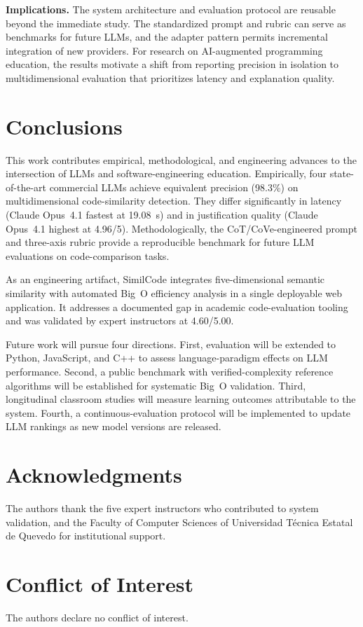 \documentclass[twocolumn,11pt]{article}
\begin{document}
    \textbf{Implications.} The system architecture and evaluation protocol are reusable beyond the immediate study. The standardized prompt and rubric can serve as benchmarks for future LLMs, and the adapter pattern permits incremental integration of new providers. For research on AI-augmented programming education, the results motivate a shift from reporting precision in isolation to multidimensional evaluation that prioritizes latency and explanation quality.
    \section{Conclusions}\label{sec:conclusion}
    This work contributes empirical, methodological, and engineering advances to the intersection of LLMs and software-engineering education. Empirically, four state-of-the-art commercial LLMs achieve equivalent precision (98.3\%) on multidimensional code-similarity detection. They differ significantly in latency (Claude Opus~4.1 fastest at 19.08~s) and in justification quality (Claude Opus~4.1 highest at 4.96/5). Methodologically, the CoT/CoVe-engineered prompt and three-axis rubric provide a reproducible benchmark for future LLM evaluations on code-comparison tasks.
     
    As an engineering artifact, SimilCode integrates five-dimensional semantic similarity with automated Big~O efficiency analysis in a single deployable web application. It addresses a documented gap in academic code-evaluation tooling and was validated by expert instructors at 4.60/5.00.
     
    Future work will pursue four directions. First, evaluation will be extended to Python, JavaScript, and C++ to assess language-paradigm effects on LLM performance. Second, a public benchmark with verified-complexity reference algorithms will be established for systematic Big~O validation. Third, longitudinal classroom studies will measure learning outcomes attributable to the system. Fourth, a continuous-evaluation protocol will be implemented to update LLM rankings as new model versions are released.
    \section*{Acknowledgments}
    The authors thank the five expert instructors who contributed to system validation, and the Faculty of Computer Sciences of Universidad T\'ecnica Estatal de Quevedo for institutional support.
    \section*{Conflict of Interest}
    The authors declare no conflict of interest.
    
    
\end{document}

